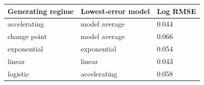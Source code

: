 \begin{tabular}{lll}
\toprule
Generating regime & Lowest-error model & Log RMSE \\
\midrule
accelerating & model average & 0.044 \\
change point & model average & 0.066 \\
exponential & exponential & 0.054 \\
linear & linear & 0.043 \\
logistic & accelerating & 0.058 \\
\bottomrule
\end{tabular}
